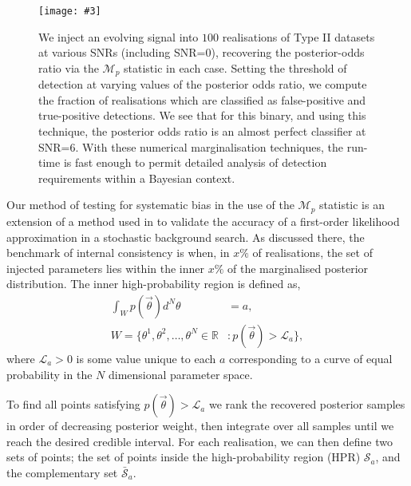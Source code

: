 \documentclass[prd,twocolumn,showpacs,nofootinbib]{revtex4}
\newcommand{\incgraph}[3]{\texttt{[image: \#3]}}
\begin{document}
\begin{figure}
  \centering
  \incgraph{0}{0.5}{ROCcurves_M7e8_Fgw2m8_15-06-2014.pdf}
   \caption{\label{fig:ROC}We inject an evolving signal into $100$ realisations of Type II datasets at various SNRs (including SNR=0), recovering the posterior-odds ratio via the {\bf $\mathcal{M}_p$} statistic in each case. Setting the threshold of detection at varying values of the posterior odds ratio, we compute the fraction of realisations which are classified as false-positive and true-positive detections. We see that for this binary, and using this technique, the posterior odds ratio is an almost perfect classifier at SNR=6. With these numerical marginalisation techniques, the run-time is fast enough to permit detailed analysis of detection requirements within a Bayesian context.} 
 \end{figure}

Our method of testing for systematic bias in the use of the {\bf $\mathcal{M}_p$} statistic is an extension of a method used in \citet{ellis-first-order} to validate the accuracy of a first-order likelihood approximation in a stochastic background search. As discussed there, the benchmark of internal consistency is when, in $x\%$ of realisations, the set of injected parameters lies within the inner $x\%$ of the marginalised posterior distribution. The inner high-probability region is defined as,
\begin{align}
\int_W p(\vec\theta )d^N\theta &= a, \\\nonumber
W = \{\theta^1,\theta^2,\ldots,\theta^N\in\mathbb{R} &: p(\vec\theta )>\mathcal{L}_a\},
\end{align}
where $\mathcal{L}_a>0$ is some value unique to each $a$ corresponding to a curve of equal probability in the $N$ dimensional parameter space.

To find all points satisfying $p(\vec\theta )>\mathcal{L}_a$  we rank the recovered posterior samples in order of decreasing posterior weight, then integrate over all samples until we reach the desired credible interval. For each realisation, we can then define two sets of points; the set of points inside the high-probability region (HPR) $\mathcal{S}_a$, and the complementary set $\mathcal{\bar S}_a$.
\end{document}
